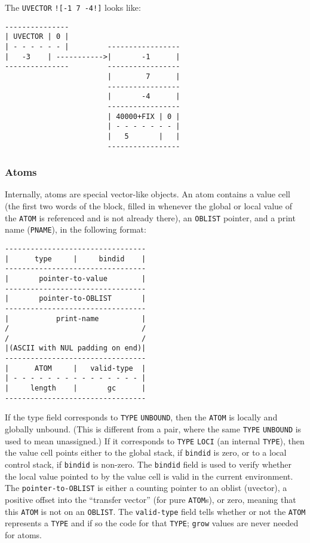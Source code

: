 \documentclass[a4paper]{scrbook}
\begin{document}
The \texttt{UVECTOR} \texttt{!{[}-1\ 7\ -4!{]}} looks like:

\begin{verbatim}
---------------
| UVECTOR | 0 |
| - - - - - - |         -----------------
|   -3    | ----------->|       -1      |
---------------         -----------------
                        |        7      |
                        -----------------
                        |       -4      |
                        -----------------
                        | 40000+FIX | 0 |
                        | - - - - - - - |
                        |   5       |   |
                        -----------------
\end{verbatim}

\subsubsection*{Atoms}\label{atoms}

Internally, atoms are special vector-like objects. An atom contains a value cell (the first two words of the block, filled
in whenever the global or local value of the \texttt{ATOM} is referenced and is not already there), an \texttt{OBLIST}
pointer, and a print name (\texttt{PNAME}), in the following format:

\begin{verbatim}
---------------------------------
|      type     |     bindid    |
---------------------------------
|       pointer-to-value        |
---------------------------------
|       pointer-to-OBLIST       |
---------------------------------
|           print-name          |
/                               /
/                               /
|(ASCII with NUL padding on end)|
---------------------------------
|      ATOM     |   valid-type  |
| - - - - - - - - - - - - - - - |
|     length    |       gc      |
---------------------------------
\end{verbatim}

If the type field corresponds to \texttt{TYPE} \texttt{UNBOUND}, then the \texttt{ATOM} is locally
and globally unbound. (This is different from a pair, where the same \texttt{TYPE} \texttt{UNBOUND} is used to mean
unassigned.) If it corresponds to \texttt{TYPE} \texttt{LOCI} (an internal \texttt{TYPE}), then the value cell points
either to the global stack, if \texttt{bindid} is zero, or to a local control stack, if \texttt{bindid} is non-zero. The
\texttt{bindid} field is used to verify whether the local value pointed to by the value cell is valid in the current
environment. The \texttt{pointer-to-OBLIST} is either a counting pointer to an oblist (uvector), a positive offset into the
``transfer vector'' (for pure \texttt{ATOM}s), or zero, meaning that this \texttt{ATOM} is not on an \texttt{OBLIST}. The
\texttt{valid-type} field tells whether or not the \texttt{ATOM} represents a \texttt{TYPE} and if so the code for that
\texttt{TYPE}; \texttt{grow} values are never needed for atoms.
\end{document}
